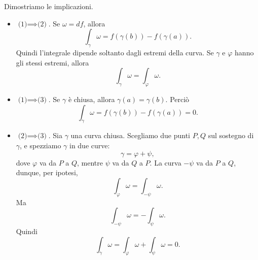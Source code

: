 \documentclass[a4paper]{article}
\begin{document}
\begin{snippetproof}{}
    Dimostriamo le implicazioni.

    \begin{itemize}
        \item \(\text{(1)}\implies\text{(2)}\).
            Se \(\omega=df\), allora
            \[
                \int_\gamma \omega
                =
                f(\gamma(b))-f(\gamma(a)).
            \]
            Quindi l'integrale dipende soltanto dagli estremi della curva. Se \(\gamma\) e \(\varphi\) hanno gli stessi estremi, allora
            \[
                \int_\gamma \omega=\int_\varphi \omega.
            \]

        \item \(\text{(1)}\implies\text{(3)}\).
            Se \(\gamma\) è chiusa, allora \(\gamma(a)=\gamma(b)\). Perciò
            \[
                \int_\gamma \omega
                =
                f(\gamma(b))-f(\gamma(a))
                =
                0.
            \]

        \item \(\text{(2)}\implies\text{(3)}\).
            Sia \(\gamma\) una curva chiusa. Scegliamo due punti \(P,Q\) sul sostegno di \(\gamma\), e spezziamo \(\gamma\) in due curve:
            \[
                \gamma=\varphi+\psi,
            \]
            dove \(\varphi\) va da \(P\) a \(Q\), mentre \(\psi\) va da \(Q\) a \(P\). La curva \(-\psi\) va da \(P\) a \(Q\), dunque, per ipotesi,
            \[
                \int_\varphi \omega=\int_{-\psi}\omega.
            \]
            Ma
            \[
                \int_{-\psi}\omega=-\int_\psi\omega.
            \]
            Quindi
            \[
                \int_\gamma \omega
                =
                \int_\varphi \omega+\int_\psi\omega
                =
                0.
            \]

            \begin{center}
            \end{center}


\end{itemize}
\end{snippetproof}
\end{document}
